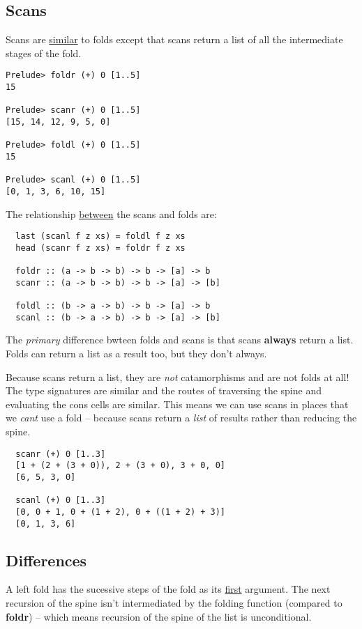 \subsection{Scans}
Scans are \underline{similar} to folds except that scans return a list of all the intermediate stages of the fold. 
\begin{verbatim}
Prelude> foldr (+) 0 [1..5]
15

Prelude> scanr (+) 0 [1..5]
[15, 14, 12, 9, 5, 0]

Prelude> foldl (+) 0 [1..5]
15

Prelude> scanl (+) 0 [1..5]
[0, 1, 3, 6, 10, 15]
\end{verbatim}

The relationship \underline{between} the scans and folds are:
\begin{lstlisting}
  last (scanl f z xs) = foldl f z xs
  head (scanr f z xs) = foldr f z xs

  foldr :: (a -> b -> b) -> b -> [a] -> b
  scanr :: (a -> b -> b) -> b -> [a] -> [b]

  foldl :: (b -> a -> b) -> b -> [a] -> b
  scanl :: (b -> a -> b) -> b -> [a] -> [b]
\end{lstlisting}

The \emph{primary} difference bwteen folds and scans is that scans \textbf{always} return a list.
Folds can return a list as a result too, but they don't always.

Because scans return a list, they are \emph{not} catamorphisms and are not folds at all!
The type signatures are similar and the routes of traversing the spine and evaluating the cons cells
are similar. This means we can use scans in places that we \emph{cant} use a fold -- because scans return a \emph{list} of results rather than reducing the spine.

\begin{lstlisting}
  scanr (+) 0 [1..3]
  [1 + (2 + (3 + 0)), 2 + (3 + 0), 3 + 0, 0]
  [6, 5, 3, 0]

  scanl (+) 0 [1..3]
  [0, 0 + 1, 0 + (1 + 2), 0 + ((1 + 2) + 3)]
  [0, 1, 3, 6]
\end{lstlisting}

\newpage

\subsection{Differences}
A left fold has the sucessive steps of the fold as its \underline{first} argument.
The next recursion of the spine isn't intermediated by the folding function (compared to \textbf{foldr}) -- which means recursion
of the spine of the list is unconditional.

